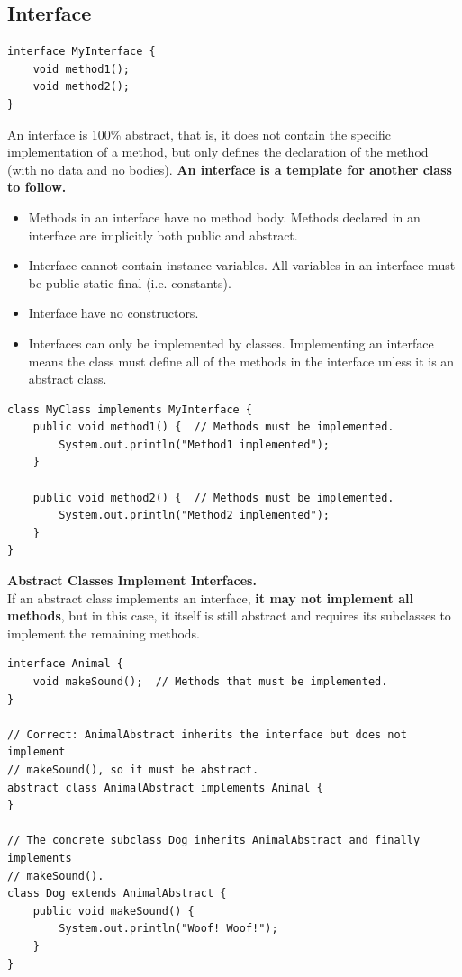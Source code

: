 \documentclass[letterpaper,12pt]{article}
\begin{document}
\subsection{Interface}
\begin{verbatim}
interface MyInterface {
    void method1();
    void method2();
}
\end{verbatim}
An interface is 100\% abstract, that is, it does not contain the specific implementation of a method, but only defines the declaration of the method (with no data and no bodies). \textbf{An interface is a template for another class to follow.}
\begin{itemize}
    \item Methods in an interface have no method body. Methods declared in an interface are implicitly both public and abstract.
    \item Interface cannot contain instance variables. All variables in an interface must be public static final (i.e. constants).
    \item Interface have no constructors.
    \item Interfaces can only be implemented by classes. Implementing an interface means the class must define all of the methods in the interface unless it is an abstract class.
\end{itemize}
\begin{verbatim}
class MyClass implements MyInterface {
    public void method1() {  // Methods must be implemented.
        System.out.println("Method1 implemented");
    }

    public void method2() {  // Methods must be implemented.
        System.out.println("Method2 implemented");
    }
}
\end{verbatim}
\textbf{Abstract Classes Implement Interfaces.}\\
If an abstract class implements an interface, \textbf{it may not implement all methods}, but in this case, it itself is still abstract and requires its subclasses to implement the remaining methods.
\begin{verbatim}
interface Animal {
    void makeSound();  // Methods that must be implemented.
}

// Correct: AnimalAbstract inherits the interface but does not implement
// makeSound(), so it must be abstract.
abstract class AnimalAbstract implements Animal {
}

// The concrete subclass Dog inherits AnimalAbstract and finally implements
// makeSound().
class Dog extends AnimalAbstract {
    public void makeSound() {
        System.out.println("Woof! Woof!");
    }
}
\end{verbatim}
\end{document}
